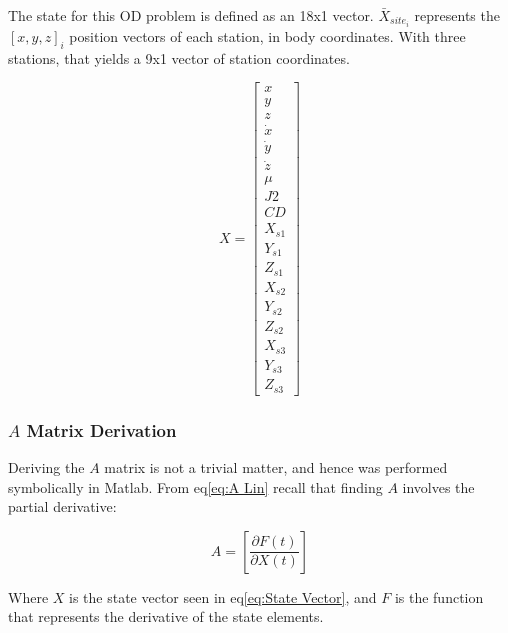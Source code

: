 \documentclass[12pt,a4paper,oneside]{article}
\numberwithin{equation}{section}   		%
\newcommand{\brackets} [1] {\left[ #1 \right]}
\newcommand{\arrayb}[2]{\brackets{ \begin{array}{#1}  #2 \end{array} } }
\newcommand{\stateArray}{\arrayb{c}{	x	\\
							y 		\\
							z 		\\
						\dot{x} 	\\
						\dot{y} 	\\
							\dot{z}	\\
							\mu 	\\
							J2 		\\
							CD		\\
							X_{s1} 	\\
							Y_{s1}	\\
							Z_{s1}	\\
							X_{s2} \\
							Y_{s2}	\\
							Z_{s2}	\\
							X_{s3} 	\\
							Y_{s3} 	\\
							Z_{s3}}
							}
\begin{document}
The state for this OD problem is defined as an 18x1 vector. $\bar{X}_{site_i}$ represents the $[x ,y, z]_i$ position vectors of each station, in body coordinates. With three stations, that yields a 9x1 vector of station coordinates.


\begin{equation}
	X=
	\stateArray
	\label{eq:State Vector}
\end{equation}





\subsubsection{$A$ Matrix Derivation}
\label{sec:A Derivation}
Deriving the $A$ matrix is not a trivial matter, and hence was performed symbolically in Matlab. From eq\eqref{eq:A Lin} recall that finding $A$ involves the partial derivative:


\begin{displaymath}
	A=\brackets{ \frac{\partial F(t)}{\partial X(t)} }
\end{displaymath}


Where $X$ is the state vector seen in eq\eqref{eq:State Vector}, and $F$ is the function that represents the derivative of the state elements.
\end{document}
